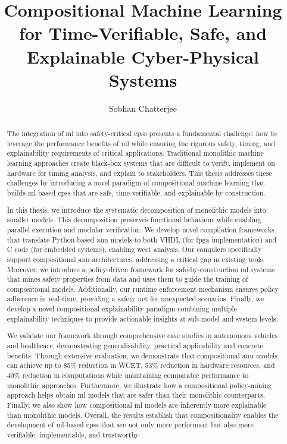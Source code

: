 \documentclass[a4paper,12pt,numbered,print,twoside]{uathesis}
\theoremstyle{remark}
\begin{document}
\title{Compositional Machine Learning for Time-Verifiable, Safe, and Explainable Cyber-Physical Systems}
\author{Sobhan Chatterjee}

\maketitle

\frontmatter
\begin{abstract}
  The integration of \gls{ml} into safety-critical \glspl{cps} presents a fundamental challenge: how to leverage the performance benefits of \gls{ml} while ensuring the rigorous safety, timing, and explainability requirements of critical applications. Traditional monolithic machine learning approaches create black-box systems that are difficult to verify, implement on hardware for timing analysis, and explain to stakeholders. This thesis addresses these challenges by introducing a novel paradigm of compositional machine learning that builds \gls{ml}-based \glspl{cps}  that are safe, time-verifiable, and explainable by construction.

  In this thesis, we introduce the systematic decomposition of monolithic models into smaller models. This decomposition preserves functional behaviour while enabling parallel execution and modular verification. We develop novel compilation frameworks that translate Python-based \gls{ann} models to both VHDL (for \gls{fpga} implementation) and C code (for embedded systems), enabling \gls{wcet} analysis. Our compilers specifically support compositional \gls{ann} architectures, addressing a critical gap in existing tools. Moreover, we introduce a policy-driven framework for safe-by-construction \gls{ml} systems that mines safety properties from data and uses them to guide the training of compositional models. Additionally, our runtime enforcement mechanism ensures policy adherence in real-time, providing a safety net for unexpected scenarios. Finally, we develop a novel compositional explainability paradigm combining multiple explainability techniques to provide actionable insights at sub-model and system levels.
  
  We validate our framework through comprehensive case studies in autonomous vehicles and healthcare, demonstrating generalisability, practical applicability and concrete benefits. Through extensive evaluation, we demonstrate that compositional \gls{ann} models can achieve up to 85\% reduction in WCET, 53\% reduction in hardware resources, and 40\% reduction in computations while maintaining comparable performance to monolithic approaches. Furthermore, we illustrate how a compositional policy-mining approach helps obtain \gls{ml} models that are safer than their monolithic counterparts. Finally, we also show how compositional \gls{ml} models are inherently more explainable than monolithic models. Overall, the results establish that compositionality enables the development of \gls{ml}-based \glspl{cps} that are not only more performant but also more verifiable, implementable, and trustworthy.


\end{abstract}
\end{document}

